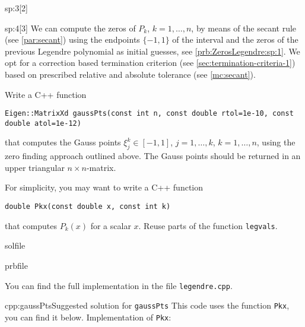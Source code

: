 \begin{samproblem}
\begin{subproblem}{sp:3}[2]
\end{subproblem}

\begin{subproblem}{sp:4}[3]
  We can compute the zeros of $P_k$, $k=1,\dots,n$, by means of the secant rule (see \cref{par:secant}) using the endpoints 
  $\{-1,1\}$ of the interval and the zeros of the previous Legendre polynomial as initial guesses, see \ref{prb:ZerosLegendre:sp:1}. 
  We opt for a correction based termination criterion (see \cref{sec:termination-criteria-1}) based on prescribed relative and 
  absolute tolerance (see \cref{mc:secant}).

  Write a C++ function
  \begin{lstlisting}[style=cpp]
Eigen::MatrixXd gaussPts(const int n, const double rtol=1e-10, const double atol=1e-12)
  \end{lstlisting}
  that computes the Gauss points $\xi^k_j\in [-1,1]$, $j=1,\dots,k$, $k=1,\dots,n$, using the zero finding approach outlined above. 
  The Gauss points should be returned in  an upper triangular $n\times n$-matrix.

  \begin{samhint}
    For simplicity, you may want to write a C++ function
    \begin{lstlisting}[style=cpp]
double Pkx(const double x, const int k)
    \end{lstlisting}
    that computes $P_k(x)$ for a scalar $x$. Reuse parts of the function \texttt{legvals}.
  \end{samhint}

  \begin{samwriteprbpart}{solfile}
    \begin{writeverbatim}{prbfile}
      \begin{samsolution}
        You can find the full implementation in the file \texttt{legendre.cpp}.
        \begin{samcode}[C++-code]{cpp:gaussPts}{Suggested solution for \texttt{gaussPts}}
          This code uses the function \texttt{Pkx}, you can find it below.
          Implementation of \texttt{Pkx}:
        \end{samcode}
      \end{samsolution}
    \end{writeverbatim}
  \end{samwriteprbpart}


\end{subproblem}
\end{samproblem}
